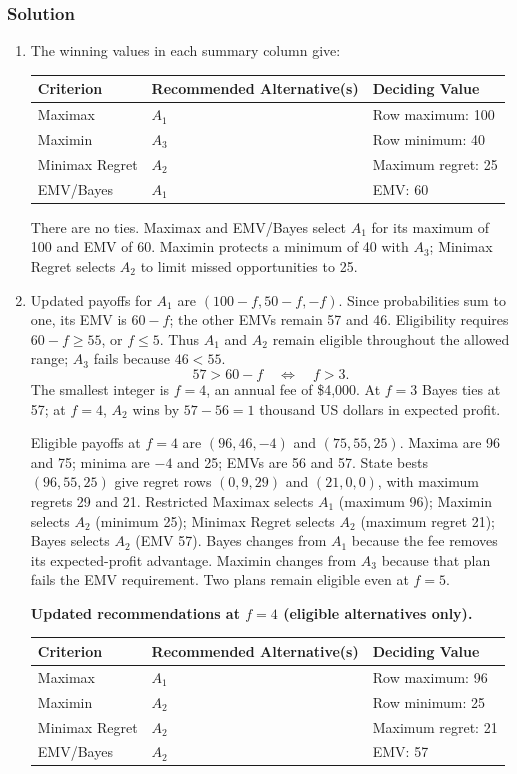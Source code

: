 \subsubsection*{Solution}
\label{subsec:c8-printing-solution}
\begin{enumerate}
\item The winning values in each summary column give:
\begin{center}
\begin{tabular}{lll}\toprule
Criterion & Recommended Alternative(s) & Deciding Value\\\midrule
Maximax & $A_1$ & Row maximum: 100\\
Maximin & $A_3$ & Row minimum: 40\\
Minimax Regret & $A_2$ & Maximum regret: 25\\
EMV/Bayes & $A_1$ & EMV: 60\\\bottomrule
\end{tabular}
\end{center}
There are no ties. Maximax and EMV/Bayes select $A_1$ for its maximum of 100 and EMV of 60. Maximin protects a minimum of 40 with $A_3$; Minimax Regret selects $A_2$ to limit missed opportunities to 25.
\item Updated payoffs for $A_1$ are $(100-f,50-f,-f)$. Since probabilities sum to one, its EMV is $60-f$; the other EMVs remain 57 and 46. Eligibility requires $60-f\geq55$, or $f\leq5$. Thus $A_1$ and $A_2$ remain eligible throughout the allowed range; $A_3$ fails because $46<55$.
\[
57>60-f\quad\Longleftrightarrow\quad f>3.
\]
The smallest integer is $\boxed{f=4}$, an annual fee of \$4,000. At $f=3$ Bayes ties at 57; at $f=4$, $A_2$ wins by $57-56=1$ thousand US dollars in expected profit.

Eligible payoffs at $f=4$ are $(96,46,-4)$ and $(75,55,25)$. Maxima are 96 and 75; minima are $-4$ and 25; EMVs are 56 and 57. State bests $(96,55,25)$ give regret rows $(0,9,29)$ and $(21,0,0)$, with maximum regrets 29 and 21. Restricted Maximax selects $A_1$ (maximum 96); Maximin selects $A_2$ (minimum 25); Minimax Regret selects $A_2$ (maximum regret 21); Bayes selects $A_2$ (EMV 57). Bayes changes from $A_1$ because the fee removes its expected-profit advantage. Maximin changes from $A_3$ because that plan fails the EMV requirement. Two plans remain eligible even at $f=5$.

\textbf{Updated recommendations at $f=4$ (eligible alternatives only).}
\begin{center}
\begin{tabular}{lll}\toprule
Criterion & Recommended Alternative(s) & Deciding Value\\\midrule
Maximax & $A_1$ & Row maximum: 96\\
Maximin & $A_2$ & Row minimum: 25\\
Minimax Regret & $A_2$ & Maximum regret: 21\\
EMV/Bayes & $A_2$ & EMV: 57\\\bottomrule
\end{tabular}
\end{center}
\end{enumerate}

